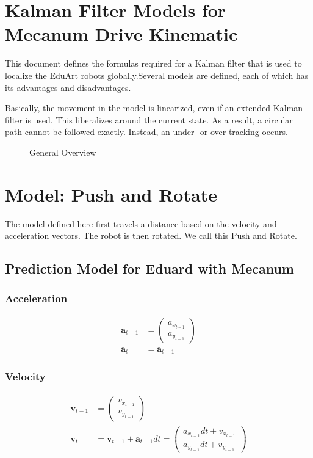 \documentclass{article}
\begin{document}
\section{Kalman Filter Models for Mecanum Drive Kinematic}

This document defines the formulas required for a Kalman filter that is used to localize the EduArt robots globally.Several models are defined, each of which has its advantages and disadvantages. 

Basically, the movement in the model is linearized, even if an extended Kalman filter is used. This liberalizes around the current state. As a result, a circular path cannot be followed exactly. Instead, an under- or over-tracking occurs.

\begin{figure}
  \center
  
  \caption{General Overview}
  \label{fig:general_overview}
\end{figure}

\clearpage
\section{Model: Push and Rotate}



The model defined here first travels a distance based on the velocity and acceleration vectors. The robot is then rotated. We call this Push and Rotate.

\subsection{Prediction Model for Eduard with Mecanum}

\subsubsection{Acceleration}
\begin{align}
  \textbf{a}_{t-1} &= \left(\begin{matrix}a_{x_{t-1}}\\a_{y_{t-1}}\end{matrix}\right) \\
  \textbf{a}_t &= \textbf{a}_{t-1}
\end{align}

\subsubsection{Velocity}
\begin{align}
  \textbf{v}_{t-1} &= \left(\begin{matrix}v_{x_{t-1}}\\v_{y_{t-1}}\end{matrix}\right) \\
  \textbf{v}_t &= \textbf{v}_{t-1} + \textbf{a}_{t-1} dt = 
  \left(\begin{matrix}a_{x_{t-1}} dt + v_{x_{t-1}}\\a_{y_{t-1}} dt + v_{y_{t-1}}\end{matrix}\right)
\end{align}
\end{document}
